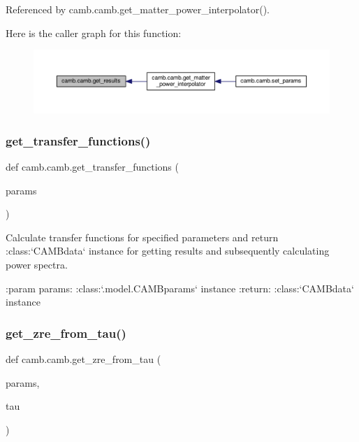 Referenced by camb.\+camb.\+get\+\_\+matter\+\_\+power\+\_\+interpolator().

Here is the caller graph for this function\+:
\nopagebreak
\begin{figure}[H]
\begin{center}
\leavevmode
\includegraphics[width=350pt]{namespacecamb_1_1camb_a7e83f6bc935783f6948a0e9c4a9d9ed1_icgraph}
\end{center}
\end{figure}
\mbox{\label{namespacecamb_1_1camb_a460a9d6f9f2c11ad461f4dc26186372d}} 
\subsubsection{\texorpdfstring{get\+\_\+transfer\+\_\+functions()}{get\_transfer\_functions()}}
{\footnotesize\ttfamily def camb.\+camb.\+get\+\_\+transfer\+\_\+functions (\begin{DoxyParamCaption}\item[{}]{params }\end{DoxyParamCaption})}

\begin{DoxyVerb}Calculate transfer functions for specified parameters and return :class:`CAMBdata` instance for getting results
and subsequently calculating power spectra.

:param params: :class:`.model.CAMBparams` instance
:return: :class:`CAMBdata` instance
\end{DoxyVerb}
 \mbox{\label{namespacecamb_1_1camb_a7c5ffb7470d6adb95c92208185c5487b}} 
\subsubsection{\texorpdfstring{get\+\_\+zre\+\_\+from\+\_\+tau()}{get\_zre\_from\_tau()}}
{\footnotesize\ttfamily def camb.\+camb.\+get\+\_\+zre\+\_\+from\+\_\+tau (\begin{DoxyParamCaption}\item[{}]{params,  }\item[{}]{tau }\end{DoxyParamCaption})}

